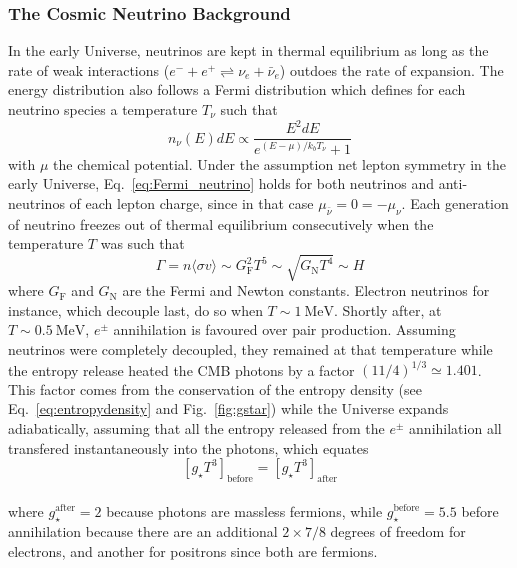 \subsubsection{The Cosmic Neutrino Background}

In the early Universe, neutrinos are kept in thermal equilibrium as long as the rate of weak interactions ($e^{-} + e^{+} \rightleftharpoons \nu_e + \bar{\nu}_e$) outdoes the rate of expansion. The energy distribution also follows a Fermi distribution which defines for each neutrino species a temperature $T_\nu$ such that
\begin{equation}
\label{eq:Fermi_neutrino}
n_{\nu} (E) dE \propto \frac{E^2 dE}{e^{(E - \mu) / k_b T_\nu} + 1}
\end{equation} with $\mu$ the chemical potential. Under the assumption net lepton symmetry in the early Universe, Eq.~\ref{eq:Fermi_neutrino} holds for both neutrinos and anti-neutrinos of each lepton charge, since in that case $\mu_{\bar{\nu}} = 0 = - \mu_\nu$. Each generation of neutrino freezes out of thermal equilibrium consecutively when the temperature $T$ was such that
\begin{equation}
\Gamma = n \langle \sigma v \rangle \sim G^2_\mathrm{F} T^5 \sim \sqrt{G_\mathrm{N} T^4} \sim H
\end{equation} where $G_\mathrm{F}$ and $G_\mathrm{N}$ are the Fermi and Newton constants. Electron neutrinos for instance, which decouple last, do  so when $T \sim 1 ~\mathrm{MeV}$. Shortly after, at $T \sim 0.5 ~\mathrm{MeV}$, $e^{\pm}$ annihilation is favoured over pair production. Assuming neutrinos were completely decoupled, they remained at that temperature while the entropy release heated the CMB photons by a factor $(11/4)^{1/3} \simeq 1.401$. 
This factor comes from the conservation of the entropy density (see Eq.~\ref{eq:entropydensity} and Fig.~\ref{fig:gstar}) while the Universe expands adiabatically, assuming that all the entropy released from the $e^{\pm}$ annihilation all transfered instantaneously into the photons, which equates\\
\begin{equation}
\left[ g_\star T^3\right]_\mathrm{before} = \left[ g_\star T^3\right]_\mathrm{after}
\end{equation} \\ where $g_\star^\mathrm{after} = 2$ because photons are massless fermions, while $g_\star^\mathrm{before} = 5.5$ before annihilation because there are an additional $2 \times 7/8$ degrees of freedom for electrons, and another for positrons since both are fermions. \\

